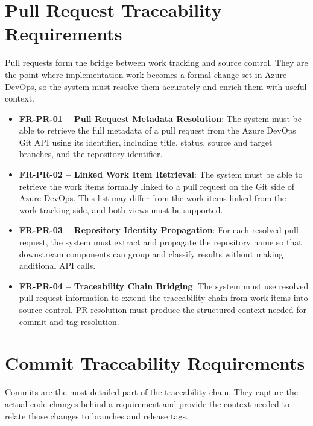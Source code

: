 \section{Pull Request Traceability Requirements}
\label{sec:req-pull-requests}

Pull requests form the bridge between work tracking and source control. They are
the point where implementation work becomes a formal change set in Azure
DevOps, so the system must resolve them accurately and enrich them with useful
context.

\begin{itemize}
  \item \textbf{FR-PR-01 -- Pull Request Metadata Resolution}: The system must be able to retrieve the full metadata of a pull request from the Azure DevOps Git API using its identifier, including title, status, source and target branches, and the repository identifier.

  \item \textbf{FR-PR-02 -- Linked Work Item Retrieval}: The system must be able to retrieve the work items formally linked to a pull request on the Git side of Azure DevOps. This list may differ from the work items linked from the work-tracking side, and both views must be supported.

  \item \textbf{FR-PR-03 -- Repository Identity Propagation}: For each resolved pull request, the system must extract and propagate the repository name so that downstream components can group and classify results without making additional API calls.

  \item \textbf{FR-PR-04 -- Traceability Chain Bridging}: The system must use resolved pull request information to extend the traceability chain from work items into source control. PR resolution must produce the structured context needed for commit and tag resolution.
\end{itemize}

\section{Commit Traceability Requirements}
\label{sec:req-commits}

Commits are the most detailed part of the traceability chain. They capture the
actual code changes behind a requirement and provide the context needed to
relate those changes to branches and release tags.

